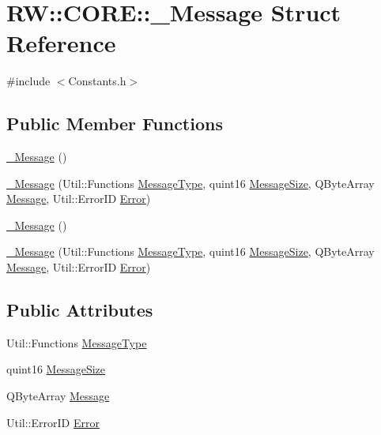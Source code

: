 \hypertarget{struct_r_w_1_1_c_o_r_e_1_1___message}{}\section{RW\+:\+:C\+O\+RE\+:\+:\+\_\+\+Message Struct Reference}
\label{struct_r_w_1_1_c_o_r_e_1_1___message}


{\ttfamily \#include $<$Constants.\+h$>$}

\subsection*{Public Member Functions}
\begin{DoxyCompactItemize}
\item 
\hyperlink{struct_r_w_1_1_c_o_r_e_1_1___message_ac3c261b3da08864054ea50df9e6d32c8}{\+\_\+\+Message} ()
\item 
\hyperlink{struct_r_w_1_1_c_o_r_e_1_1___message_a9b99a2dbdd3c75786a2f90bc91707c36}{\+\_\+\+Message} (Util\+::\+Functions \hyperlink{struct_r_w_1_1_c_o_r_e_1_1___message_abc67122c243af657f68760c56fa5f8a6}{Message\+Type}, quint16 \hyperlink{struct_r_w_1_1_c_o_r_e_1_1___message_a725845fb07a2a8052cdab2e29f1d5fb2}{Message\+Size}, Q\+Byte\+Array \hyperlink{namespace_r_w_1_1_c_o_r_e_a571834b44d0e3fab58aa6abfe5a02988}{Message}, Util\+::\+Error\+ID \hyperlink{struct_r_w_1_1_c_o_r_e_1_1___message_ac01d35ce7dec7eab461377e395feb363}{Error})
\item 
\hyperlink{struct_r_w_1_1_c_o_r_e_1_1___message_ac3c261b3da08864054ea50df9e6d32c8}{\+\_\+\+Message} ()
\item 
\hyperlink{struct_r_w_1_1_c_o_r_e_1_1___message_a9b99a2dbdd3c75786a2f90bc91707c36}{\+\_\+\+Message} (Util\+::\+Functions \hyperlink{struct_r_w_1_1_c_o_r_e_1_1___message_abc67122c243af657f68760c56fa5f8a6}{Message\+Type}, quint16 \hyperlink{struct_r_w_1_1_c_o_r_e_1_1___message_a725845fb07a2a8052cdab2e29f1d5fb2}{Message\+Size}, Q\+Byte\+Array \hyperlink{namespace_r_w_1_1_c_o_r_e_a571834b44d0e3fab58aa6abfe5a02988}{Message}, Util\+::\+Error\+ID \hyperlink{struct_r_w_1_1_c_o_r_e_1_1___message_ac01d35ce7dec7eab461377e395feb363}{Error})
\end{DoxyCompactItemize}
\subsection*{Public Attributes}
\begin{DoxyCompactItemize}
\item 
Util\+::\+Functions \hyperlink{struct_r_w_1_1_c_o_r_e_1_1___message_abc67122c243af657f68760c56fa5f8a6}{Message\+Type}
\item 
quint16 \hyperlink{struct_r_w_1_1_c_o_r_e_1_1___message_a725845fb07a2a8052cdab2e29f1d5fb2}{Message\+Size}
\item 
Q\+Byte\+Array \hyperlink{struct_r_w_1_1_c_o_r_e_1_1___message_aa864261c124d4cdbdd582069e0fa7773}{Message}
\item 
Util\+::\+Error\+ID \hyperlink{struct_r_w_1_1_c_o_r_e_1_1___message_ac01d35ce7dec7eab461377e395feb363}{Error}
\end{DoxyCompactItemize}


